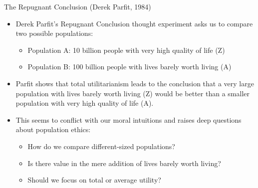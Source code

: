 \documentclass[aspectratio=169]{beamer}
\begin{document}
\begin{frame}{The Repugnant Conclusion (Derek Parfit, 1984)}
    \begin{itemize}
        \item Derek Parfit's Repugnant Conclusion thought experiment asks us to compare two possible populations:
            \begin{itemize}
                \item Population A: 10 billion people with very high quality of life (Z)
                \item Population B: 100 billion people with lives barely worth living (A)
            \end{itemize}
        \item Parfit shows that total utilitarianism leads to the conclusion that a very large population with lives barely worth living (Z) would be better than a smaller population with very high quality of life (A).
        
        \item This seems to conflict with our moral intuitions and raises deep questions about population ethics:
            \begin{itemize}
                \item How do we compare different-sized populations?
                \item Is there value in the mere addition of lives barely worth living?
                \item Should we focus on total or average utility?
            \end{itemize}
    \end{itemize}
\end{frame}
\end{document}
